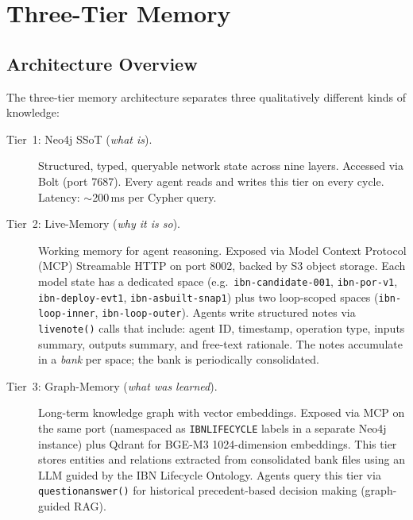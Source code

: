 \documentclass[acmtog]{acmart}
\renewcommand\_{\textunderscore\allowbreak}
\begin{document}
\section{Three-Tier Memory}\label{sec:memory}

\subsection{Architecture Overview}

The three-tier memory architecture separates three qualitatively
different kinds of knowledge:

\begin{description}
  \item[Tier~1: Neo4j SSoT (\emph{what is}).]
    Structured, typed, queryable network state across nine layers.
    Accessed via Bolt (port 7687). Every agent reads and writes
    this tier on every cycle. Latency: $\sim$200\,ms per Cypher
    query.

  \item[Tier~2: Live-Memory (\emph{why it is so}).]
    Working memory for agent reasoning. Exposed via Model Context
    Protocol (MCP) Streamable HTTP on port 8002, backed by S3
    object storage. Each model state has a dedicated space (e.g.\
    \texttt{ibn-candidate-001}, \texttt{ibn-por-v1},
    \texttt{ibn-deploy-evt1}, \texttt{ibn-asbuilt-snap1}) plus
    two loop-scoped spaces (\texttt{ibn-loop-inner},
    \texttt{ibn-loop-outer}). Agents write structured notes via
    \texttt{live\_note()} calls that include: agent ID, timestamp,
    operation type, inputs summary, outputs summary, and
    free-text rationale. The notes accumulate in a \emph{bank}
    per space; the bank is periodically consolidated.

  \item[Tier~3: Graph-Memory (\emph{what was learned}).]
    Long-term knowledge graph with vector embeddings. Exposed via
    MCP on the same port (namespaced as \texttt{IBN\_LIFECYCLE\_*}
    labels in a separate Neo4j instance) plus Qdrant for BGE-M3
    1024-dimension embeddings. This tier stores entities and
    relations extracted from consolidated bank files using an
    LLM guided by the IBN Lifecycle Ontology. Agents query this
    tier via \texttt{question\_answer()} for historical
    precedent-based decision making (graph-guided RAG).
\end{description}
\end{document}
